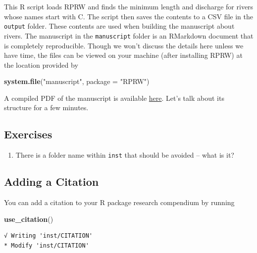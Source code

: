 \documentclass[
]{book}
\newenvironment{Shaded}{\begin{snugshade}}{\end{snugshade}}
\newcommand{\DataTypeTok}[1]{\textcolor[rgb]{0.13,0.29,0.53}{#1}}
\newcommand{\KeywordTok}[1]{\textcolor[rgb]{0.13,0.29,0.53}{\textbf{#1}}}
\newcommand{\NormalTok}[1]{#1}
\newcommand{\StringTok}[1]{\textcolor[rgb]{0.31,0.60,0.02}{#1}}
\providecommand{\tightlist}{%
  \setlength{\itemsep}{0pt}\setlength{\parskip}{0pt}}
\begin{document}
This R script loads RPRW and finds the minimum length and discharge for rivers whose names start with C. The script then saves the contents to a CSV file in the \texttt{output} folder. These contents are used when building the manuscript about rivers. The manuscript in the \texttt{manuscript} folder is an RMarkdown document that is completely reproducible. Though we won't discuss the details here unless we have time, the files can be viewed on your machine (after installing RPRW) at the location provided by

\begin{Shaded}
\begin{Highlighting}[]
\KeywordTok{system.file}\NormalTok{(}\StringTok{"manuscript"}\NormalTok{, }\DataTypeTok{package =} \StringTok{"RPRW"}\NormalTok{)}
\end{Highlighting}
\end{Shaded}

A compiled PDF of the manuscript is available \href{https://github.com/michaeldumelle/RPRW/blob/main/inst/manuscript/manuscript.pdf}{here}. Let's talk about its structure for a few minutes.

\hypertarget{exercises-7}{%
\subsection{Exercises}\label{exercises-7}}

\begin{enumerate}
\def\labelenumi{\arabic{enumi}.}
\tightlist
\item
  There is a folder name within \texttt{inst} that should be avoided -- what is it?
\end{enumerate}

\hypertarget{adding-a-citation}{%
\subsection{Adding a Citation}\label{adding-a-citation}}

You can add a citation to your R package research compendium by running

\begin{Shaded}
\begin{Highlighting}[]
\KeywordTok{use_citation}\NormalTok{()}
\end{Highlighting}
\end{Shaded}

\begin{verbatim}
√ Writing 'inst/CITATION'
* Modify 'inst/CITATION'
\end{verbatim}
\end{document}
